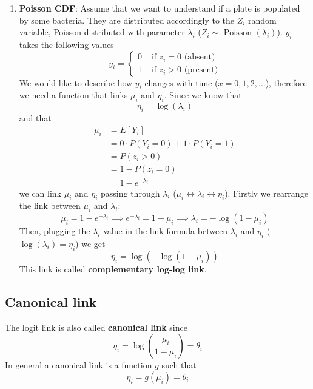 \begin{enumerate}
         \item \textbf{Poisson CDF}: 
        Assume that we want to understand if a plate is populated by some
        bacteria. They are distributed accordingly to the $Z_i$ random variable,
        Poisson distributed with parameter $\lambda_i$ ($Z_i \sim \text{ Poisson
        }(\lambda_i)$). $y_i$ takes the following values
        $$
        y_i = 
        \begin{cases}
          0 & \text{ if } z_i = 0 \text{ (absent)} \\
          1 & \text{ if }  z_i > 0 \text{ (present)}
        \end{cases}
        $$
        We would like to describe how $y_i$ changes with time ($x = 0, 1, 2,
        \dots$), therefore we need a function that links $\mu_i$ and $\eta_i$.
        Since we know that 
        $$\eta_i = \log(\lambda_i)$$ and that
        \begin{align*}
        \mu_i 
          &= E[Y_i] \\
          &= 0 \cdot P(Y_i = 0) + 1 \cdot P(Y_i = 1) \\
          &= P(z_i > 0) \\ 
          &= 1 - P(z_i = 0) \\
          &= 1 - e^{-\lambda_i}
        \end{align*}
        we can link $\mu_i$ and $\eta_i$ passing through $\lambda_i$ ($\mu_i
        \leftrightarrow \lambda_i \leftrightarrow \eta_i$). Firstly we rearrange
        the link between $\mu_i$ and $\lambda_i$:
        $$\mu_i = 1 - e^{-\lambda_i} \implies e^{-\lambda_i} = 1 - \mu_i
        \implies \lambda_i = -\log(1 - \mu_i)$$ Then, plugging the $\lambda_i$
        value in the link formula between $\lambda_i$ and $\eta_i$
        ($\log(\lambda_i) = \eta_i$) we get
        $$\eta_i = \log(-\log(1-\mu_i))$$ This link is called
        \textbf{complementary log-log link}.
      \end{enumerate}

    \subsection{Canonical link}
      The logit link is also called \textbf{canonical link} since 
      $$\eta_i = \log\left(\frac{\mu_i}{1-\mu_i}\right) = \theta_i$$ In general
      a canonical link is a function $g$ such that 
      $$\eta_i = g(\mu_i) = \theta_i$$ 
      
